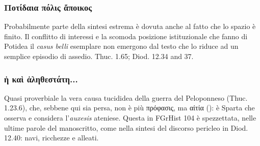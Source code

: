 {            \subsubsection{\textgreek{Ποτίδαια πόλις ἄποικος}}
           Probabilmente parte della sintesi estrema è dovuta anche al fatto che lo spazio è finito. Il conflitto di interessi e la scomoda posizione istituzionale che fanno di Potidea il \emph{casus belli} esemplare non emergono dal testo che lo riduce ad un semplice episodio di assedio. Thuc. 1.65; Diod. 12.34 and 37.
            
            \subsubsection{\textgreek{ἡ καὶ ἀληθεστάτη...}}
            Quasi proverbiale la vera causa tucididea della guerra del Peloponneso (Thuc. 1.23.6), che, sebbene qui sia persa, non è più \textgreek{πρόφασις}, ma \textgreek{αἰτία} (\cite[444]{Parmeggiani2011}): è Sparta che osserva e considera l'\emph{auxesis}  ateniese. Questa in FGrHist 104 è spezzettata, nelle ultime parole del manoscritto, come nella sintesi del discorso pericleo in Diod. 12.40: navi, ricchezze e alleati. 
            }